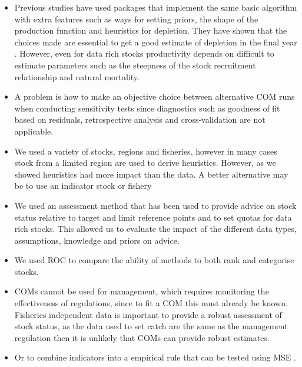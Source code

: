 \begin{itemize}
\item Previous studies have used packages that implement the same basic algorithm with extra features such as ways for setting priors, the shape of the production function and heuristics for depletion. They have shown that the choices made are essential to get a good estimate of depletion in the final year \citep{rosenberg2014developing}. However, even for data rich stocks productivity depends on difficult to estimate parameters such as the steepness of the stock recruitment relationship and natural mortality.  
\item A problem is how to make an objective choice between alternative COM runs when conducting sensitivity tests since diagnostics such as goodness of fit based on residuals, retrospective analysis and cross-validation are not applicable.
\item We used a variety of stocks, regions and fisheries, however in many cases stock from a limited region are used to derive heuristics. However, as we showed heuristics had more impact than the data. A better alternative may be to use an indicator stock or fishery
\item We used an assessment method that has been used to provide advice on stock status relative to target and limit reference points and to set quotas for data rich stocks. This allowed us to evaluate the impact of the different data types, assumptions, knowledge and priors on advice. 
\item We used ROC to compare the ability of methods to both rank and categorise stocks.
\item COMs cannot be used for management, which requires monitoring the effectiveness of regulations, since to fit a COM this must already be known. Fisheries independent data is important to provide a robust assessment of stock status, as the data used to set catch are the same as the management regulation then it is unlikely that COMs can provide robust estimates.    
\item Or to combine indicators into a empirical rule that can be tested using MSE \citep{fischer2020hcr}.
\end{itemize}



